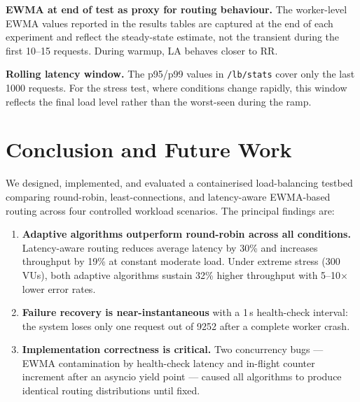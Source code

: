 \documentclass[conference]{IEEEtran}
\begin{document}
\textbf{EWMA at end of test as proxy for routing behaviour.}
The worker-level EWMA values reported in the results tables are
captured at the end of each experiment and reflect the steady-state
estimate, not the transient during the first 10--15 requests. During
warmup, LA behaves closer to RR.

\textbf{Rolling latency window.} The p95/p99 values in
\texttt{/lb/stats} cover only the last 1000 requests. For the stress
test, where conditions change rapidly, this window reflects the final
load level rather than the worst-seen during the ramp.

\section{Conclusion and Future Work}

We designed, implemented, and evaluated a containerised load-balancing
testbed comparing round-robin, least-connections, and latency-aware
EWMA-based routing across four controlled workload scenarios. The
principal findings are:

\begin{enumerate}
    \item \textbf{Adaptive algorithms outperform round-robin across all
    conditions.} Latency-aware routing reduces average latency by 30\%
    and increases throughput by 19\% at constant moderate load. Under
    extreme stress (300\,VUs), both adaptive algorithms sustain 32\%
    higher throughput with 5--10$\times$ lower error rates.
    \item \textbf{Failure recovery is near-instantaneous} with a 1\,s
    health-check interval: the system loses only one request out of 9252
    after a complete worker crash.
    \item \textbf{Implementation correctness is critical.} Two concurrency
    bugs --- EWMA contamination by health-check latency and in-flight
    counter increment after an asyncio yield point --- caused all
    algorithms to produce identical routing distributions until fixed.
\end{enumerate}
\end{document}
